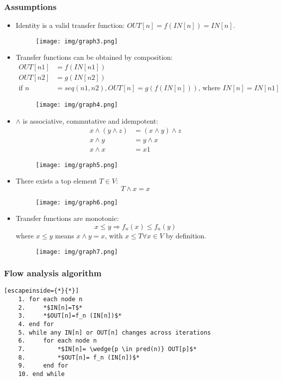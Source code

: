 \documentclass[a4paper, 10pt, titlepage]{article}
\begin{document}
\subsubsection{Assumptions}
\begin{itemize}
\item Identity is a valid transfer function: $OUT[n] = f(IN[n]) = IN[n]$.
\begin{figure}[h]
\centering
\texttt{[image: img/graph3.png]}
\end{figure}

\item Transfer functions can be obtained by composition:
\begin{align*}
OUT[n1] &= f(IN[n1]) \\
OUT[n2] &= g(IN[n2]) \\
\text{if }n &= seq(n1, n2), OUT[n] = g(f(IN[n]))\text{, where } IN[n] = IN[n1]
\end{align*}
\vspace*{-5mm}
\begin{figure}[h]
\centering
\texttt{[image: img/graph4.png]}
\end{figure}
\item $\wedge$ is associative, commutative and idempotent:
\begin{align*}
x \wedge (y \wedge z) &= (x \wedge y) \wedge z \\
x \wedge y &= y \wedge x \\
x \wedge x &= x1
\end{align*}
\vspace*{-5mm}
\begin{figure}[h]
\centering
\texttt{[image: img/graph5.png]}
\end{figure}
\item There exists a top element $T \in V$:
$$T \wedge x = x$$
\vspace*{-5mm}
\begin{figure}[h]
\centering
\texttt{[image: img/graph6.png]}
\end{figure}
\item Transfer functions are monotonic:
$$x \leq y \Rightarrow f_n(x) \leq f_n(y)$$
where $x \leq y$ means $x \wedge y = x$, with $x \leq T \forall x \in V$ by definition.
\begin{figure}[h]
\centering
\texttt{[image: img/graph7.png]}
\end{figure}
\end{itemize}

\subsubsection{Flow analysis algorithm}
\begin{lstlisting}[escapeinside={*}{*}]
	1. for each node n
	2. 	   *$IN[n]=T$*
	3.     *$OUT[n]=f_n (IN[n])$*
	4. end for
	5. while any IN[n] or OUT[n] changes across iterations
	6.     for each node n
	7.		   *$IN[n]= \wedge{p \in pred(n)} OUT[p]$*
	8.         *$OUT[n]= f_n (IN[n])$*
	9.	   end for
	10. end while
\end{lstlisting}
\end{document}

